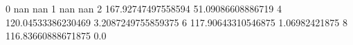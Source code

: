 0 nan nan
1 nan nan
2 167.92747497558594 51.09086608886719
4 120.04533386230469 3.2087249755859375
6 117.90643310546875 1.06982421875
8 116.83660888671875 0.0
